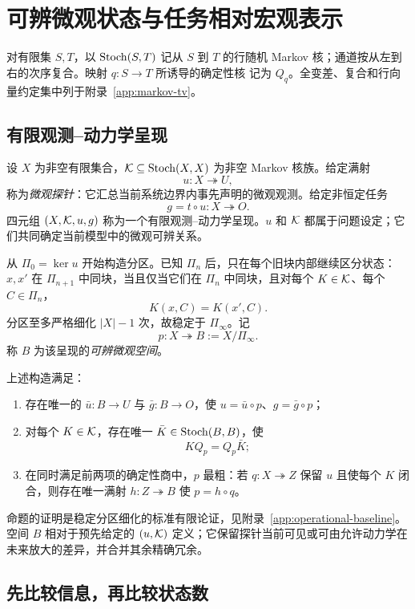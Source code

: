 \section{可辨微观状态与任务相对宏观表示}
\label{sec:operational}

对有限集 $S,T$，以 $\operatorname{Stoch}(S,T)$ 记从 $S$ 到 $T$ 的行随机 Markov
核；通道按从左到右的次序复合。映射 $q:S\to T$ 所诱导的确定性核
记为 $Q_q$。全变差、复合和行向量约定集中列于附录~\ref{app:markov-tv}。

\subsection{有限观测--动力学呈现}

设 $X$ 为非空有限集合，$\mathcal K\subseteq\operatorname{Stoch}(X,X)$ 为非空 Markov 核族。给定满射
\[
u:X\twoheadrightarrow U,
\]
称为\emph{微观探针}：它汇总当前系统边界内事先声明的微观观测。给定非恒定任务
\[
g=t\circ u:X\twoheadrightarrow O.
\]
四元组 $(X,\mathcal K,u,g)$ 称为一个有限观测--动力学呈现。$u$ 和 $\mathcal K$ 都属于问题设定；它们共同确定当前模型中的微观可辨关系。

从 $\Pi_0=\ker u$ 开始构造分区。已知 $\Pi_n$ 后，只在每个旧块内部继续区分状态：$x,x'$ 在 $\Pi_{n+1}$ 中同块，当且仅当它们在 $\Pi_n$ 中同块，且对每个 $K\in\mathcal K$、每个 $C\in\Pi_n$，
\[
K(x,C)=K(x',C).
\]
分区至多严格细化 $|X|-1$ 次，故稳定于 $\Pi_\infty$。记
\[
p:X\twoheadrightarrow B:=X/\Pi_\infty.
\]
称 $B$ 为该呈现的\emph{可辨微观空间}。

\begin{proposition}[可辨微观基线]
\label{prop:operational-baseline}
上述构造满足：
\begin{enumerate}
  \item 存在唯一的 $\bar u:B\to U$ 与 $\bar g:B\to O$，使 $u=\bar u\circ p$、$g=\bar g\circ p$；
  \item 对每个 $K\in\mathcal K$，存在唯一 $\bar K\in\operatorname{Stoch}(B,B)$，使
  \[
  KQ_p=Q_p\bar K;
  \]
  \item 在同时满足前两项的确定性商中，$p$ 最粗：若 $q:X\twoheadrightarrow Z$ 保留 $u$ 且使每个 $K$ 闭合，则存在唯一满射 $h:Z\twoheadrightarrow B$ 使 $p=h\circ q$。
\end{enumerate}
\end{proposition}

命题的证明是稳定分区细化的标准有限论证，见附录~\ref{app:operational-baseline}。空间 $B$ 相对于预先给定的 $(u,\mathcal K)$ 定义；它保留探针当前可见或可由允许动力学在未来放大的差异，并合并其余精确冗余。

\subsection{先比较信息，再比较状态数}

